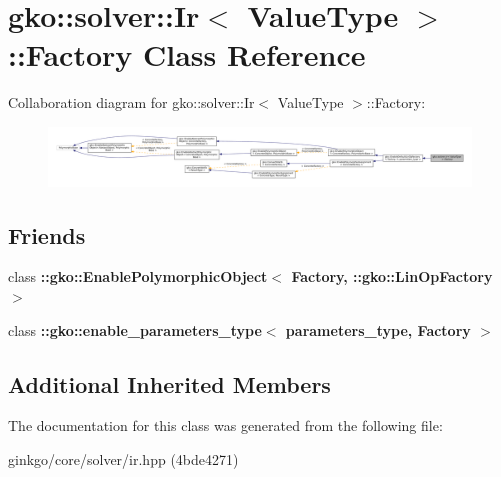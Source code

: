 \hypertarget{classgko_1_1solver_1_1Ir_1_1Factory}{}\section{gko\+:\+:solver\+:\+:Ir$<$ Value\+Type $>$\+:\+:Factory Class Reference}
\label{classgko_1_1solver_1_1Ir_1_1Factory}


Collaboration diagram for gko\+:\+:solver\+:\+:Ir$<$ Value\+Type $>$\+:\+:Factory\+:
\nopagebreak
\begin{figure}[H]
\begin{center}
\leavevmode
\includegraphics[width=350pt]{classgko_1_1solver_1_1Ir_1_1Factory__coll__graph}
\end{center}
\end{figure}
\subsection*{Friends}
\begin{DoxyCompactItemize}
\item 
\mbox{\label{classgko_1_1solver_1_1Ir_1_1Factory_a27e9bbc94a1c1c59f40833153eda8f78}} 
class {\bfseries \+::gko\+::\+Enable\+Polymorphic\+Object$<$ Factory, \+::gko\+::\+Lin\+Op\+Factory $>$}
\item 
\mbox{\label{classgko_1_1solver_1_1Ir_1_1Factory_a0d176cbd42d6214e11aee8c30ca256fc}} 
class {\bfseries \+::gko\+::enable\+\_\+parameters\+\_\+type$<$ parameters\+\_\+type, Factory $>$}
\end{DoxyCompactItemize}
\subsection*{Additional Inherited Members}


The documentation for this class was generated from the following file\+:\begin{DoxyCompactItemize}
\item 
ginkgo/core/solver/ir.\+hpp (4bde4271)\end{DoxyCompactItemize}
